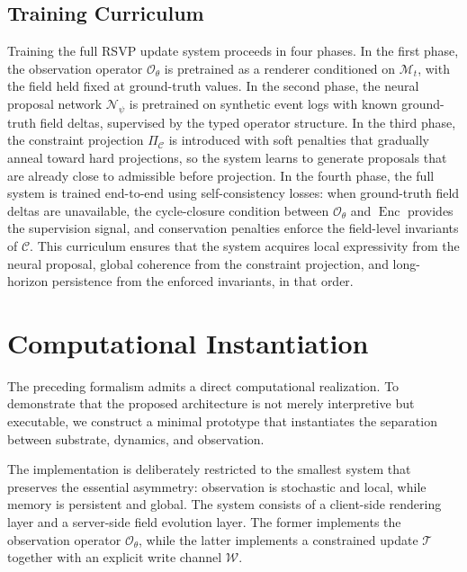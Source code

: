 \documentclass[11pt]{article}
\begin{document}
\subsection{Training Curriculum}

Training the full RSVP update system proceeds in four phases.
In the first phase, the observation operator $\mathcal{O}_\theta$ is
pretrained as a renderer conditioned on $\mathcal{M}_t$, with the field
held fixed at ground-truth values.
In the second phase, the neural proposal network $\mathcal{N}_\psi$ is
pretrained on synthetic event logs with known ground-truth field deltas,
supervised by the typed operator structure.
In the third phase, the constraint projection $\Pi_{\mathcal{C}}$ is
introduced with soft penalties that gradually anneal toward hard
projections, so the system learns to generate proposals that are already
close to admissible before projection.
In the fourth phase, the full system is trained end-to-end using
self-consistency losses: when ground-truth field deltas are unavailable,
the cycle-closure condition between $\mathcal{O}_\theta$ and
$\operatorname{Enc}$ provides the supervision signal, and conservation
penalties enforce the field-level invariants of $\mathcal{C}$.
This curriculum ensures that the system acquires local expressivity from
the neural proposal, global coherence from the constraint projection, and
long-horizon persistence from the enforced invariants, in that order.

\section{Computational Instantiation}
\label{sec:prototype}

The preceding formalism admits a direct computational realization.
To demonstrate that the proposed architecture is not merely interpretive
but executable, we construct a minimal prototype that instantiates the
separation between substrate, dynamics, and observation.

The implementation is deliberately restricted to the smallest system that
preserves the essential asymmetry: observation is stochastic and local,
while memory is persistent and global.
The system consists of a client-side rendering layer and a server-side
field evolution layer.
The former implements the observation operator $\mathcal{O}_\theta$, while
the latter implements a constrained update $\mathcal{T}$ together with an
explicit write channel $\mathcal{W}$.
\end{document}
